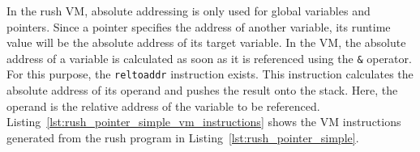 
In the rush VM, absolute addressing is only used for global variables and pointers.
Since a pointer specifies the address of another variable, its runtime value will be the absolute address of its target variable.
In the VM, the absolute address of a variable is calculated as soon as it is referenced using the \texttt{\&} operator.
For this purpose, the \texttt{reltoaddr} instruction exists.
This instruction calculates the absolute address of its operand and pushes the result onto the stack.
Here, the operand is the relative address of the variable to be referenced.
Listing~\ref{lst:rush_pointer_simple_vm_instructions} shows the VM instructions generated from the rush program in Listing~\ref{lst:rush_pointer_simple}.


